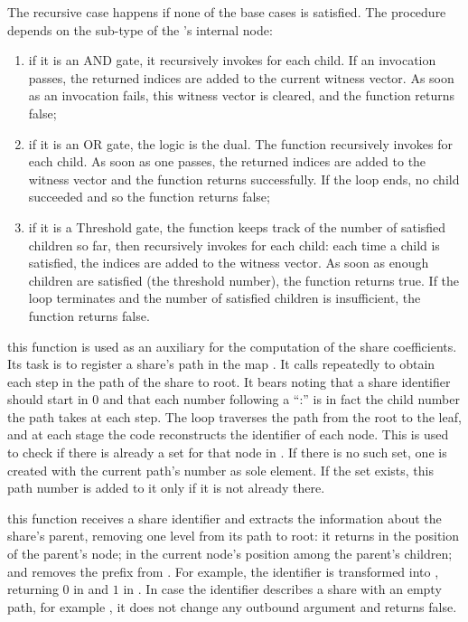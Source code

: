 \documentclass{article}
\begin{document}
\begin{description}
The recursive case happens if none of the base cases is satisfied. The procedure depends on the sub-type of the \ctree's internal node:
\begin{enumerate}
\item if it is an AND gate, it recursively invokes  for each child. If an invocation passes, the returned indices are added to the current witness vector. As soon as an invocation fails, this witness vector is cleared, and the function returns false;
\item if it is an OR gate, the logic is the dual. The function recursively invokes  for each child. As soon as one passes, the returned indices are added to the witness vector and the function returns successfully. If the loop ends, no child succeeded and so the function returns false;
\item if it is a Threshold gate, the function keeps track of the number of satisfied children so far, then recursively invokes  for each child: each time a child is satisfied, the indices are added to the witness vector. As soon as enough children are satisfied (the threshold number), the function returns true. If the loop terminates and the number of satisfied children is insufficient, the function returns false. 
\end{enumerate}


\item[\code{storeSharePrefixes()}] this function is used as an auxiliary for the computation of the share coefficients. Its task is to register a share's path in the map . It calls  repeatedly to obtain each step in the path of the share to root. It bears noting that a share identifier should start in $0$ and that each number following a ``:'' is in fact the child number the path takes at each step. The loop traverses the path from the root to the leaf, and at each stage the code reconstructs the identifier of each node. This is used to check if there is already a set for that node in . If there is no such set, one is created with the current path's number as sole element. If the set exists, this path number is added to it only if it is not already there. 

\item[\code{extractPrefixAndNoFromID()}] this function receives a share identifier and extracts the information about the share's parent, removing one level from its path to root: it returns in  the position of the parent's node; in  the current node's position among the parent's children; and removes the prefix from . For example, the identifier  is transformed into , returning $0$ in  and $1$ in . In case the identifier describes a share with an empty path, for example , it does not change any outbound argument and returns false.


\end{description}
\end{document}
